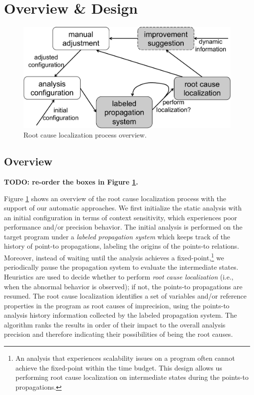 \section{Overview \& Design}
\label{design}

\begin{figure}[th!]
        \includegraphics[width=0.9\columnwidth]{overview}
\caption{\textmd{Root cause localization process overview.}}
\label{fig:overview}
\end{figure}

\subsection{Overview}

{\bf TODO: re-order the boxes in Figure \ref{fig:overview}.}

Figure \ref{fig:overview} shows an overview of the root cause localization process with the support of our automatic approaches. We first initialize the static analysis with an initial configuration in terms of context sensitivity, which experiences poor performance and/or precision behavior. The initial analysis is performed on the target program under a {\it labeled propagation system} which keeps track of the history of point-to propagations, labeling the origins of the points-to relations. Moreover, instead of waiting until the analysis achieves a fixed-point,\footnote{An analysis that experiences scalability issues on a program often cannot achieve the fixed-point within the time budget. This design allows us performing root cause localization on intermediate states during the points-to propagations.} we periodically pause the propagation system to evaluate the intermediate states. Heuristics are used to decide whether to perform {\it root cause localization} (i.e., when the abnormal behavior is observed); if not, the points-to propagations are resumed. The root cause localization identifies a set of variables and/or reference properties in the program as root causes of imprecision, using the points-to analysis history information collected by the labeled propagation system. The algorithm ranks the results in order of their impact to the overall analysis precision and therefore indicating their possibilities of being the root causes.

